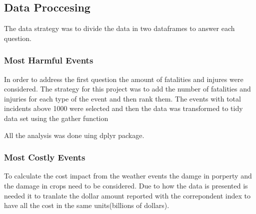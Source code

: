 \documentclass[]{article}
\begin{document}
\subsection{Data Proccesing}\label{data-proccesing}

The data strategy was to divide the data in two dataframes to answer
each question.

\subsubsection{Most Harmful Events}\label{most-harmful-events}

In order to address the first question the amount of fatalities and
injures were considered. The strategy for this project was to add the
number of fatalities and injuries for each type of the event and then
rank them. The events with total incidents above 1000 were selected and
then the data was transformed to tidy data set using the gather function

All the analysis was done uing dplyr package.

\subsubsection{Most Costly Events}\label{most-costly-events}

To calculate the cost impact from the weather events the damge in
porperty and the damage in crops need to be considered. Due to how the
data is presented is needed it to tranlate the dollar amount reported
with the correpondent index to have all the cost in the same
units(billions of dollars).
\end{document}
